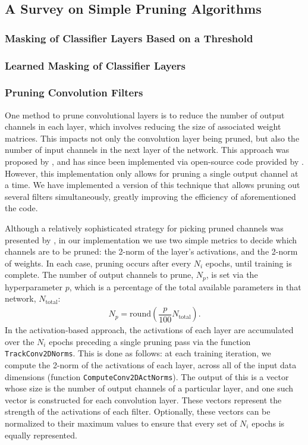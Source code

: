 \documentclass{article}
\begin{document}
\subsection{A Survey on Simple Pruning Algorithms}

\subsubsection{Masking of Classifier Layers Based on a Threshold} \label{maskClass}

\subsubsection{Learned Masking of Classifier Layers} \label{maskClassL0}

\subsubsection{Pruning Convolution Filters} \label{PruneFilter}

One method to prune convolutional layers is to reduce the number of output channels in each layer, which involves reducing the size of associated weight matrices. This impacts not only the convolution layer being pruned, but also the number of input channels in the next layer of the network. This approach was proposed by \cite{prune_transfer_learning}, and has since been implemented via open-source code provided by \cite{jacobgilblog}. However, this implementation only allows for pruning a single output channel at a time. We have implemented a version of this technique that allows pruning out several filters simultaneously, greatly improving the efficiency of aforementioned the code.

Although a relatively sophisticated strategy for picking pruned channels was presented by \cite{prune_transfer_learning}, in our implementation we use two simple metrics to decide which channels are to be pruned: the 2-norm of the layer's activations, and the 2-norm of weights. In each case, pruning occurs after every $N_i$ epochs, until training is complete. The number of output channels to prune, $N_p$, is set via the hyperparameter $p$, which is a percentage of the total available parameters in that network, $N_\mathrm{total}$:
\begin{align}
	N_p = \mathrm{round} \left(\dfrac{p}{100}N_\mathrm{total}\right). \label{eqNp}
\end{align}
In the activation-based approach, the activations of each layer are accumulated over the $N_i$ epochs preceding a single pruning pass via the function \texttt{TrackConv2DNorms}. This is done as follows: at each training iteration, we compute the 2-norm of the activations of each layer, across all of the input data dimensions (function \texttt{ComputeConv2DActNorms}). The output of this is a vector whose size is the number of output channels of a particular layer, and one such vector is constructed for each convolution layer. These vectors represent the strength of the activations of each filter. Optionally, these vectors can be normalized to their maximum values to ensure that every set of $N_i$ epochs is equally represented.
\end{document}
